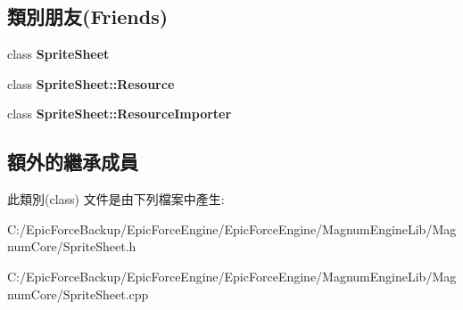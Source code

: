 \subsection*{類別朋友(Friends)}
\begin{DoxyCompactItemize}
\item 
class {\bfseries Sprite\+Sheet}\hypertarget{class_magnum_1_1_sprite_sheet_1_1_resource_ab43118917ba092ba6289c7ee4cd3e5fd}{}\label{class_magnum_1_1_sprite_sheet_1_1_resource_ab43118917ba092ba6289c7ee4cd3e5fd}

\item 
class {\bfseries Sprite\+Sheet\+::\+Resource}\hypertarget{class_magnum_1_1_sprite_sheet_1_1_resource_a8727041c910f9527ea7b20dfac74f485}{}\label{class_magnum_1_1_sprite_sheet_1_1_resource_a8727041c910f9527ea7b20dfac74f485}

\item 
class {\bfseries Sprite\+Sheet\+::\+Resource\+Importer}\hypertarget{class_magnum_1_1_sprite_sheet_1_1_resource_a3c6baee866d2819736b4c0a94c9e507c}{}\label{class_magnum_1_1_sprite_sheet_1_1_resource_a3c6baee866d2819736b4c0a94c9e507c}

\end{DoxyCompactItemize}
\subsection*{額外的繼承成員}


此類別(class) 文件是由下列檔案中產生\+:\begin{DoxyCompactItemize}
\item 
C\+:/\+Epic\+Force\+Backup/\+Epic\+Force\+Engine/\+Epic\+Force\+Engine/\+Magnum\+Engine\+Lib/\+Magnum\+Core/Sprite\+Sheet.\+h\item 
C\+:/\+Epic\+Force\+Backup/\+Epic\+Force\+Engine/\+Epic\+Force\+Engine/\+Magnum\+Engine\+Lib/\+Magnum\+Core/Sprite\+Sheet.\+cpp\end{DoxyCompactItemize}
